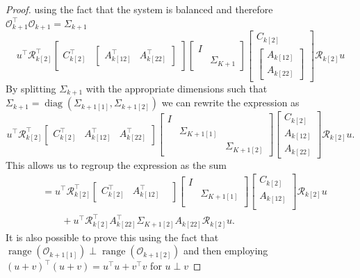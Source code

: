 \documentclass[doctype=mastersthesis,BCOR=15mm,biblatex]{ldvbook}%
\DeclareMathOperator{\diag}{diag}
\DeclareMathOperator{\range}{range}
\newcommand{\R}{\mathcal{R}} %
\newcommand{\Ob}{\mathcal{O}} %
\newcommand{\eye}{I} %
\begin{document}
\begin{proof}
using the fact that the system is balanced and therefore $\Ob_{k+1}^\top \Ob_{k+1} = \Sigma_{k+1}$
\begin{equation}
u^\top
\R_{k[2]}^\top
\begin{bmatrix}
C_{k[2]}^\top&
\begin{bmatrix}
A_{k[12]}^\top&
A_{k[22]}^\top
\end{bmatrix}
\end{bmatrix} 
\begin{bmatrix}
\eye & \\
& \Sigma_{K+1}
\end{bmatrix} 
\begin{bmatrix}
C_{k[2]}\\
\begin{bmatrix}
A_{k[12]}\\
A_{k[22]}
\end{bmatrix}
\end{bmatrix}  
\R_{k[2]} u
\end{equation}
By splitting $\Sigma_{k+1}$ with the appropriate dimensions such that  $\Sigma_{k+1} = \diag(\Sigma_{k+1[1]},\Sigma_{k+1[2]})$ we can rewrite the expression as
\begin{equation}
u^\top
\R_{k[2]}^\top
\begin{bmatrix}
C_{k[2]}^\top&
A_{k[12]}^\top&
A_{k[22]}^\top
\end{bmatrix} 
\begin{bmatrix}
\eye & \\
& \Sigma_{K+1[1]}\\
& & \Sigma_{K+1[2]}
\end{bmatrix} 
\begin{bmatrix}
C_{k[2]}\\
A_{k[12]}\\
A_{k[22]}
\end{bmatrix}  
\R_{k[2]} u
.
\end{equation}
This allows us to regroup the expression as the sum
\begin{align}
	&=
	u^\top
	\R_{k[2]}^\top
	\begin{bmatrix}
	C_{k[2]}^\top&
	A_{k[12]}^\top&
	\end{bmatrix} 
	\begin{bmatrix}
	\eye & \\
	& \Sigma_{K+1[1]}\\
	\end{bmatrix} 
	\begin{bmatrix}
	C_{k[2]}\\
	A_{k[12]}\\
	\end{bmatrix}  
	\R_{k[2]} u
\\&\quad\quad+
	u^\top
	\R_{k[2]}^\top
	A_{k[22]}^\top 
	\Sigma_{K+1[2]}
	A_{k[22]} 
	\R_{k[2]} u
	.
\end{align}
	It is also possible to prove this using the fact that $\range(\Ob_{k+1[1]})\perp \range(\Ob_{k+1[2]})$ and then employing $(u+v)^\top (u+v) = u^\top u + v^\top v$ for $u \perp v$
\end{proof}
\end{document}

